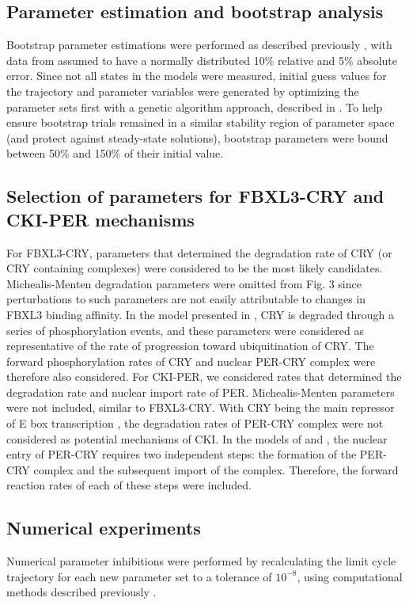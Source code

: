 \subsection{Parameter estimation and bootstrap analysis}
Bootstrap parameter estimations were performed as described previously
\cite{St.John2013}, with data from \cite{Lee2001} assumed to have a normally
distributed 10\% relative and 5\% absolute error. Since not all states in the
models were measured, initial guess values for the trajectory and parameter
variables were generated by optimizing the parameter sets first with a genetic
algorithm approach, described in \cite{Mirsky2009}. To help ensure bootstrap
trials remained in a similar stability region of parameter space (and protect
against steady-state solutions), bootstrap parameters were bound between 50\%
and 150\% of their initial value. 

\subsection{Selection of parameters for FBXL3-CRY and CKI-PER mechanisms}
For FBXL3-CRY, parameters that determined the degradation rate of CRY (or CRY
containing complexes) were considered to be the most likely candidates.
Michealis-Menten degradation parameters were omitted from Fig. 3 since
perturbations to such parameters are not easily attributable to changes in
FBXL3 binding affinity. In the model presented in \cite{Leloup2003}, CRY is
degraded through a series of phosphorylation events, and these parameters were
considered as representative of the rate of progression toward ubiquitination
of CRY. The forward phosphorylation rates of CRY and nuclear PER-CRY complex
were therefore also considered.  For CKI-PER, we considered rates that
determined the degradation rate and nuclear import rate of PER.
Michealis-Menten parameters were not included, similar to FBXL3-CRY. With CRY
being the main repressor of E box transcription \cite{Ye2011}, the degradation
rates of PER-CRY complex were not considered as potential mechanisms of CKI. In
the models of \cite{Leloup2003} and \cite{Relogio2011}, the nuclear entry of
PER-CRY requires two independent steps: the formation of the PER-CRY complex
and the subsequent import of the complex.  Therefore, the forward reaction
rates of each of these steps were included.

\subsection{Numerical experiments}
Numerical parameter inhibitions were performed by recalculating the limit cycle
trajectory for each new parameter set to a tolerance of $10^{-8}$, using
computational methods described previously \cite{Wilkins2009}.


